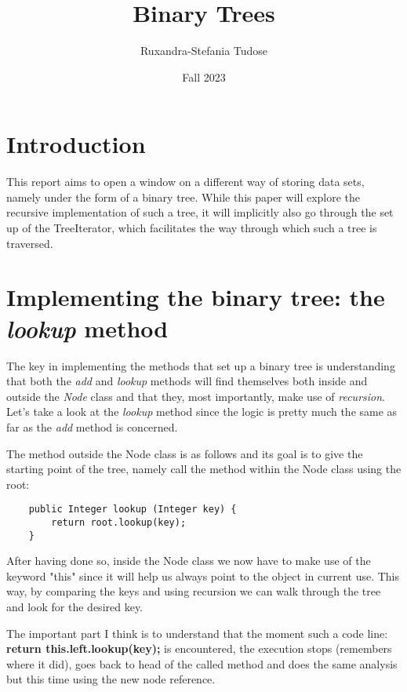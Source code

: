 \documentclass[a4paper,11pt]{article}
\begin{document}
\title{
    \textbf{Binary Trees}
}
\author{Ruxandra-Stefania Tudose}
\date{Fall 2023}

\maketitle

\section*{Introduction}
This report aims to open a window on a different way of storing data sets, namely under the form of a binary tree. While this paper will explore
the recursive implementation of such a tree, it will implicitly also go through the set up of the TreeIterator, which facilitates the way through which such a tree is traversed.

\section*{Implementing the binary tree: the \textit{lookup} method}
The key in implementing the methods that set up a binary tree is understanding that both the \textit{add}
and \textit{lookup} methods will find themselves both inside and outside the \textit{Node} class and that they, most importantly, make use of \textit{recursion}. Let's take a look at the \textit{lookup} method since the logic is pretty much the same as far as the \textit{add} method is concerned.\newline

The method outside the Node class is as follows and its goal is to give the starting point of the tree, namely call the method within the Node class using the root:
\begin{verbatim}
    public Integer lookup (Integer key) {
        return root.lookup(key); 
    }
\end{verbatim}  

After having done so, inside the Node class we now have to make use of the keyword "this" since it will help us always point to the object in current use. This way, by comparing the keys and using recursion we can walk through the tree and look for the desired key.\newline

The important part I think is to understand that the moment such a code line: \textbf{return this.left.lookup(key);} is encountered, the execution stops (remembers where it did), goes back to head of the called method and does the same analysis but this time using the new node reference.
\end{document}
